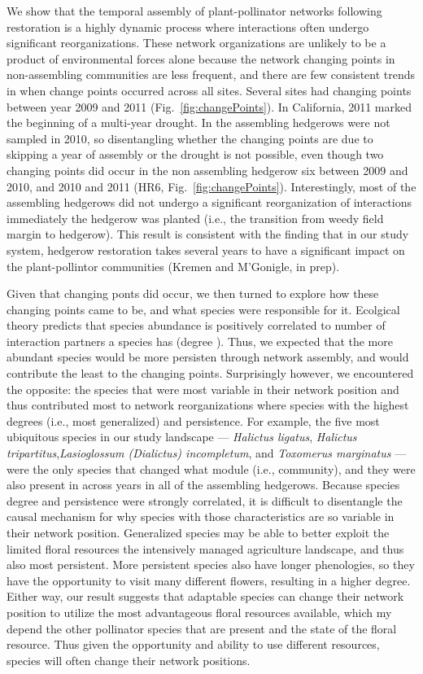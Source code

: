\documentclass[12pt]{article}
\begin{document}
We show that the temporal assembly of plant-pollinator networks
following restoration is a highly dynamic process where interactions
often undergo significant reorganizations. These network organizations
are unlikely to be a product of environmental forces alone because the
network changing points in non-assembling communities are less
frequent, and there are few consistent trends in when change points
occurred across all sites. Several sites had changing points between
year 2009 and 2011 (Fig.~\ref{fig:changePoints}). In California, 2011
marked the beginning of a multi-year drought. In the assembling
hedgerows were not sampled in 2010, so disentangling whether the
changing points are due to skipping a year of assembly or the drought
is not possible, even though two changing points did occur in the non assembling hedgerow six between 2009 and 2010, and 2010 and 2011 (HR6, Fig.~\ref{fig:changePoints}). Interestingly, most of the assembling hedgerows did
not undergo a significant reorganization of interactions immediately
the hedgerow was planted (i.e., the transition from weedy field margin
to hedgerow). This result is consistent with the finding that in our
study system, hedgerow restoration takes several years to have a
significant impact on the plant-pollintor communities (Kremen and
M'Gonigle, in prep).

Given that changing ponts did occur, we then turned to explore how these changing points came to be, and what species were responsible for it. Ecolgical theory predicts that species abundance is positively correlated to number of interaction partners a species has (degree \citep{Bluthgen2007}). Thus, we expected that the more abundant species would be more persisten through network assembly, and would contribute the least to the changing points. Surprisingly however, we encountered the opposite: the species that were most variable in
their network position and thus contributed most to network
reorganizations where species with the highest degrees (i.e., most
generalized) and persistence. For example, the five most ubiquitous
species in our study landscape --- \textit{Halictus ligatus},
\textit{Halictus tripartitus},\textit{Lasioglossum (Dialictus)
  incompletum}, and \textit{Toxomerus marginatus} --- were the
only species that changed what module (i.e., community), and they were also 
present in across years in all of the assembling hedgerows. Because
species degree and persistence were strongly correlated, it is
difficult to disentangle the causal mechanism for why species with
those characteristics are so variable in their network
position. Generalized species may be able to better exploit the limited
floral resources the intensively managed agriculture landscape, and
thus also most persistent. More persistent species also have longer
phenologies, so they have the opportunity to visit many different
flowers, resulting in a higher degree. Either way, our result suggests
that adaptable species can change their network position to utilize
the most advantageous floral resources available, which my depend the other
pollinator species that are present and the state of the floral
resource. Thus given the opportunity and ability to use different
resources, species will often change their network positions.
\end{document}
